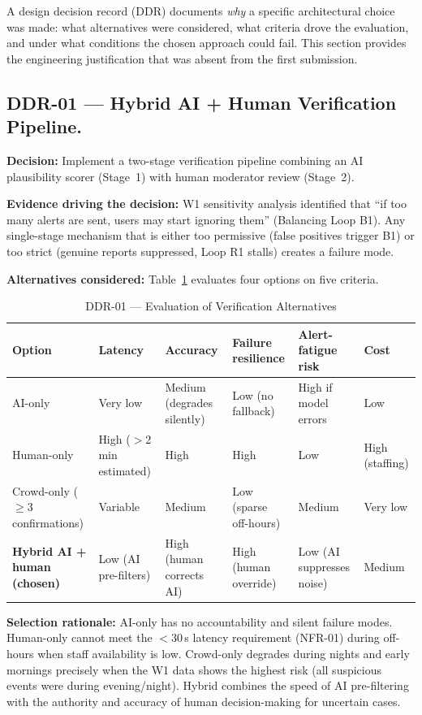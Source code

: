 \documentclass[12pt,a4paper]{article}
\begin{document}
A design decision record (DDR) documents \emph{why} a specific
architectural choice was made: what alternatives were considered,
what criteria drove the evaluation, and under what conditions the
chosen approach could fail. This section provides the engineering
justification that was absent from the first submission.

\subsection{DDR-01 --- Hybrid AI + Human Verification Pipeline.}
\label{sec:ddr01}

\textbf{Decision:} Implement a two-stage verification pipeline
combining an AI plausibility scorer (Stage~1) with human moderator
review (Stage~2).

\textbf{Evidence driving the decision:} W1 sensitivity analysis
identified that ``if too many alerts are sent, users may start
ignoring them'' (Balancing Loop B1). Any single-stage mechanism
that is either too permissive (false positives trigger B1) or too
strict (genuine reports suppressed, Loop R1 stalls) creates a failure
mode.

\textbf{Alternatives considered:}
Table~\ref{tab:ddr01} evaluates four options on five criteria.

\begin{table}[h]
\caption{DDR-01 --- Evaluation of Verification Alternatives}
\label{tab:ddr01}
\centering
\begin{tabularx}{\textwidth}{lXXXXX}
\toprule
\textbf{Option} & \textbf{Latency} & \textbf{Accuracy} & \textbf{Failure resilience} & \textbf{Alert-fatigue risk} & \textbf{Cost} \\
\midrule
AI-only & Very low & Medium (degrades silently) & Low (no fallback) & High if model errors & Low \\
Human-only & High ($>$2 min estimated) & High & High & Low & High (staffing) \\
Crowd-only ($\geq$3 confirmations) & Variable & Medium & Low (sparse off-hours) & Medium & Very low \\
\textbf{Hybrid AI + human (chosen)} & Low (AI pre-filters) & High (human corrects AI) & High (human override) & Low (AI suppresses noise) & Medium \\
\bottomrule
\end{tabularx}
\end{table}

\textbf{Selection rationale:} AI-only has no accountability and
silent failure modes. Human-only cannot meet the $<$30\,s latency
requirement (NFR-01) during off-hours when staff availability is low.
Crowd-only degrades during nights and early mornings precisely when
the W1 data shows the highest risk (all suspicious events were during
evening/night). Hybrid combines the speed of AI pre-filtering with
the authority and accuracy of human decision-making for uncertain
cases.
\end{document}
